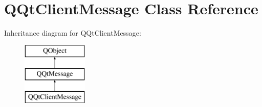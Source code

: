\hypertarget{class_q_qt_client_message}{}\section{Q\+Qt\+Client\+Message Class Reference}
\label{class_q_qt_client_message}
Inheritance diagram for Q\+Qt\+Client\+Message\+:\begin{figure}[H]
\begin{center}
\leavevmode
\includegraphics[height=3.000000cm]{class_q_qt_client_message}
\end{center}
\end{figure}
